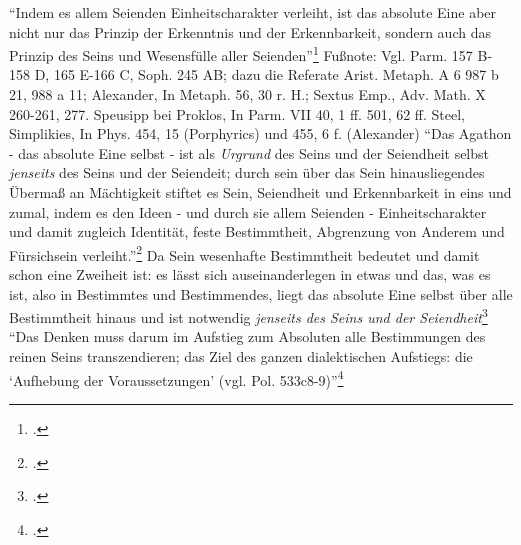 \enquote{Indem es allem Seienden Einheitscharakter verleiht, ist das absolute Eine aber nicht nur das Prinzip der Erkenntnis und der Erkennbarkeit, sondern auch das Prinzip des Seins und Wesensfülle aller Seienden}\footcite[][S. 258]{halfwassenaufstieg2006}
Fußnote: Vgl. Parm. 157 B- 158 D, 165 E-166 C, Soph. 245 AB; dazu die Referate Arist. Metaph. A 6 987 b 21, 988 a 11; Alexander, In Metaph. 56, 30 r. H.; Sextus Emp., Adv. Math. X 260-261, 277. Speusipp bei Proklos, In Parm. VII 40, 1 ff. 501, 62 ff. Steel, Simplikies, In Phys. 454, 15 (Porphyrics) und 455, 6 f. (Alexander)
\enquote{Das Agathon - das absolute Eine selbst - ist als \emph{Urgrund} des Seins und der Seiendheit selbst \emph{jenseits} des Seins und der Seiendeit; durch sein über das Sein hinausliegendes Übermaß an Mächtigkeit stiftet es Sein, Seiendheit und Erkennbarkeit in eins und zumal, indem es den Ideen - und durch sie allem Seienden - Einheitscharakter und damit zugleich Identität, feste Bestimmtheit, Abgrenzung von Anderem und Fürsichsein verleiht.}\footcite[][S. 258f.]{halfwassenaufstieg2006}
Da Sein wesenhafte Bestimmtheit bedeutet und damit schon eine Zweiheit ist: es lässt sich auseinanderlegen in etwas und das, was es ist, also in Bestimmtes und Bestimmendes, liegt das absolute Eine selbst über alle Bestimmtheit hinaus und ist notwendig \emph{jenseits des Seins und der Seiendheit}\footcite[vgl.][S. 259f.]{halfwassenaufstieg2006}
\enquote{Das Denken muss darum im Aufstieg zum Absoluten alle Bestimmungen des reinen Seins transzendieren; das Ziel des ganzen dialektischen Aufstiegs: die \enquote{Aufhebung der Voraussetzungen} (vgl. Pol. 533c8-9)}\footcite[][S. 263]{halfwassenaufstieg2006}

